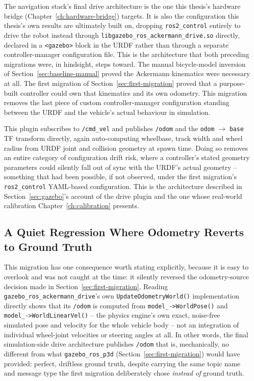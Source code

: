 The navigation stack's final drive architecture is the one this
thesis's hardware bridge (Chapter~\ref{ch:hardware-bridge}) targets.
It is also the configuration this thesis's own results are
ultimately built on, dropping \texttt{ros2\_control} entirely to
drive the robot instead through
\texttt{libgazebo\_ros\_ackermann\_drive.so}\allowbreak{} directly,
declared in a \texttt{<gazebo>} block in the URDF rather than through
a separate controller-manager configuration file. This
is the architecture that both preceding migrations were, in
hindsight, steps toward. The manual bicycle-model inversion of
Section~\ref{sec:baseline-manual} proved the Ackermann kinematics
were necessary at all. The first migration of
Section~\ref{sec:first-migration} proved that a purpose-built
controller could own that kinematics and its own odometry. This
migration removes the last piece of custom controller-manager
configuration standing between the URDF and the vehicle's actual
behaviour in simulation.

This plugin subscribes to \texttt{/cmd\_vel} and publishes
\texttt{/odom} and the \texttt{odom} $\rightarrow$ \texttt{base} TF
transform directly, again auto-computing wheelbase, track width and
wheel radius from URDF joint and collision geometry at spawn time.
Doing so removes an entire category of configuration drift risk, where a
controller's stated geometry parameters could silently fall out of
sync with the URDF's actual geometry -- something that had been
possible, if not observed, under the first migration's
\texttt{ros2\_control} YAML-based configuration. This is the
architecture described in Section~\ref{sec:gazebo}'s account of the
drive plugin and the one whose real-world calibration
Chapter~\ref{ch:calibration} presents.

\subsection{A Quiet Regression Where Odometry Reverts to Ground Truth}
\label{sec:odom-regression}

This migration has one consequence worth stating explicitly, because
it is easy to overlook and was not caught at the time: it silently
reversed the odometry-source decision made in
Section~\ref{sec:first-migration}. Reading
\texttt{gazebo\_ros\_ackermann\_drive}'s own
\texttt{UpdateOdometryWorld()} implementation directly shows that its
\texttt{/odom} is computed from \texttt{model\_->WorldPose()} and
\texttt{model\_->WorldLinearVel()} -- the physics engine's own exact,
noise-free simulated pose and velocity for the whole vehicle body --
not an integration of individual wheel-joint velocities or steering
angles at all. In other words, the final simulation-side drive
architecture publishes \texttt{/odom} that is, mechanically, no
different from what \texttt{gazebo\_ros\_p3d} (Section~\ref{sec:first-migration})
would have provided: perfect, driftless ground truth, despite carrying
the same topic name and message type the first migration deliberately
chose \emph{instead of} ground truth.

